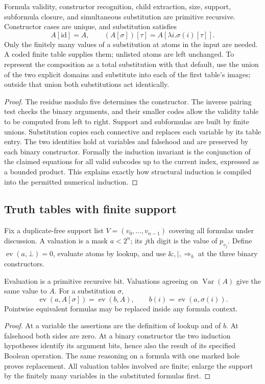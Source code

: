 \begin{theorem}\label{thm:syntax}
Formula validity, constructor recognition, child extraction, size, support,
subformula closure, and simultaneous substitution are primitive recursive.
Constructor cases are unique, and substitution satisfies
\[
 A[\mathrm{id}]=A,\qquad (A[\sigma])[\tau]=A[\lambda i.\sigma(i)[\tau]].
\]
Only the finitely many values of a substitution at atoms in the input are
needed. A coded finite table supplies them; unlisted atoms are left unchanged.
To represent the composition as a total substitution with that default,
use the union of the two explicit domains and substitute into each of the
first table's images; outside that union both substitutions act identically.
\end{theorem}
\begin{proof}
The residue modulo five determines the constructor. The inverse pairing test
checks the binary arguments, and their smaller codes allow the validity table
to be computed from left to right. Support and subformulas are built by
finite unions. Substitution copies each connective and replaces each variable
by its table entry. The two identities hold at variables and falsehood and
are preserved by each binary constructor. Formally the induction invariant
is the conjunction of the claimed equations for all valid subcodes up to the
current index, expressed as a bounded product. This explains exactly how
structural induction is compiled into the permitted numerical induction.
\end{proof}

\subsection{Truth tables with finite support}

Fix a duplicate-free support list $V=(v_0,\ldots,v_{n-1})$ covering all formulas
under discussion. A valuation is a mask $a<2^n$; its $j$th digit is the value
of $p_{v_j}$. Define $\operatorname{ev}(a,\bot)=0$, evaluate atoms by lookup,
and use $\&,|,\Rightarrow_b$ at the three binary constructors.

\begin{theorem}\label{thm:eval-subst}
Evaluation is a primitive recursive bit. Valuations agreeing on
$\operatorname{Var}(A)$ give the same value to $A$. For a substitution $\sigma$,
\[
 \operatorname{ev}(a,A[\sigma])
   =\operatorname{ev}(b,A),\qquad b(i)=\operatorname{ev}(a,\sigma(i)).
\]
Pointwise equivalent formulas may be replaced inside any formula context.
\end{theorem}
\begin{proof}
At a variable the assertions are the definition of lookup and of $b$.
At falsehood both sides are zero. At a binary constructor the two induction
hypotheses identify its argument bits, hence also the result of its specified
Boolean operation. The same reasoning on a formula with one marked hole
proves replacement. All valuation tables involved are finite; enlarge the
support by the finitely many variables in the substituted formulas first.
\end{proof}

